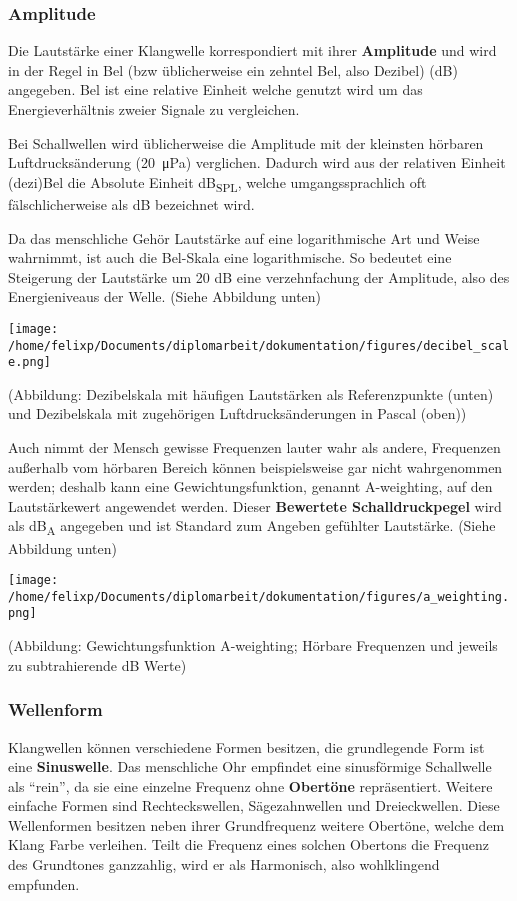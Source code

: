 \subsubsection{Amplitude}
\label{sec:orgefc47e9}
Die Lautstärke einer Klangwelle korrespondiert mit ihrer \textbf{Amplitude} und wird in der Regel in Bel (bzw üblicherweise ein zehntel Bel, also Dezibel) (\si{\dB}) angegeben. Bel ist eine relative Einheit welche genutzt wird um das Energieverhältnis zweier Signale zu vergleichen.

Bei Schallwellen wird üblicherweise die Amplitude mit der kleinsten hörbaren Luftdrucksänderung (\SI{20}{\micro\pascal}) verglichen. Dadurch wird aus der relativen Einheit (dezi)Bel die Absolute Einheit \si{\dB}\textsubscript{SPL}, welche umgangssprachlich oft fälschlicherweise als \si{\dB} bezeichnet wird.

Da das menschliche Gehör Lautstärke auf eine logarithmische Art und Weise wahrnimmt, ist auch die Bel-Skala eine logarithmische. So bedeutet eine Steigerung der Lautstärke um 20 \si{\dB} eine verzehnfachung der Amplitude, also des Energieniveaus der Welle. (Siehe Abbildung unten)

\begin{center}
\texttt{[image: /home/felixp/Documents/diplomarbeit/dokumentation/figures/decibel\_scale.png]}
\end{center}
(Abbildung: Dezibelskala mit häufigen Lautstärken als Referenzpunkte (unten) und Dezibelskala mit zugehörigen Luftdrucksänderungen in Pascal (oben))

Auch nimmt der Mensch gewisse Frequenzen lauter wahr als andere, Frequenzen außerhalb vom hörbaren Bereich können beispielsweise gar nicht wahrgenommen werden; deshalb kann eine Gewichtungsfunktion, genannt A-weighting, auf den Lautstärkewert angewendet werden. Dieser \textbf{Bewertete Schalldruckpegel} wird als \si{\dB}\textsubscript{A} angegeben und ist Standard zum Angeben gefühlter Lautstärke. (Siehe Abbildung unten)

\begin{center}
\texttt{[image: /home/felixp/Documents/diplomarbeit/dokumentation/figures/a\_weighting.png]}
\end{center}
(Abbildung: Gewichtungsfunktion A-weighting; Hörbare Frequenzen und jeweils zu subtrahierende \si{\dB} Werte)

\subsubsection{Wellenform}
\label{sec:orgc82645e}
Klangwellen können verschiedene Formen besitzen, die grundlegende Form ist eine \textbf{Sinuswelle}. Das menschliche Ohr empfindet eine sinusförmige Schallwelle als "`rein"', da sie eine einzelne Frequenz ohne \textbf{Obertöne} repräsentiert. Weitere einfache Formen sind Rechteckswellen, Sägezahnwellen und Dreieckwellen. Diese Wellenformen besitzen neben ihrer Grundfrequenz weitere Obertöne, welche dem Klang Farbe verleihen. Teilt die Frequenz eines solchen Obertons die Frequenz des Grundtones ganzzahlig, wird er als Harmonisch, also wohlklingend empfunden.

